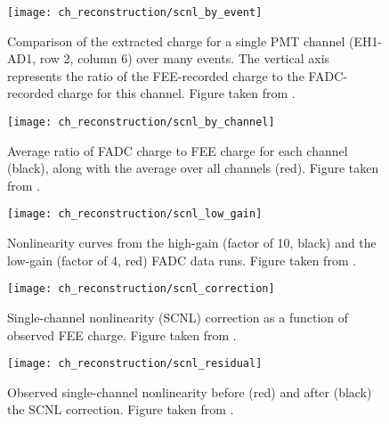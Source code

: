 \begin{figure}
    \centering
    \texttt{[image: ch\_reconstruction/scnl\_by\_event]}
    \caption[Flash ADC comparison to FEE, event by event]{
        Comparison of the extracted charge for a single PMT channel
        (EH1-AD1, row 2, column 6)
        over many events.
        The vertical axis represents the ratio of the FEE-recorded charge
        to the FADC-recorded charge for this channel.
        Figure taken from \cite{scnl_technote}.
    }
    \label{fig:scnl_by_event}
\end{figure}

\begin{figure}
    \centering
    \texttt{[image: ch\_reconstruction/scnl\_by\_channel]}
    \caption[Flash ADC comparison to FEE, channel by channel]{
        Average ratio of FADC charge to FEE charge for each channel (black),
        along with the average over all channels (red).
        Figure taken from \cite{scnl_technote}.
    }
    \label{fig:scnl_by_channel}
\end{figure}

\begin{figure}
    \centering
    \texttt{[image: ch\_reconstruction/scnl\_low\_gain]}
    \caption[Flash ADC comparison to FEE, low gain]{
        Nonlinearity curves from the high-gain (factor of 10, black)
        and the low-gain (factor of 4, red)
        FADC data runs.
        Figure taken from \cite{scnl_slides}.
    }
    \label{fig:scnl_low_gain}
\end{figure}

\begin{figure}
    \centering
    \texttt{[image: ch\_reconstruction/scnl\_correction]}
    \caption[SCNL: final correction curve]{
        Single-channel nonlinearity (SCNL) correction
        as a function of observed FEE charge.
        Figure taken from \cite{scnl_technote}.
    }
    \label{fig:scnl_correction}
\end{figure}

\begin{figure}
    \centering
    \texttt{[image: ch\_reconstruction/scnl\_residual]}
    \caption[SCNL: residual nonlinearity]{
        Observed single-channel nonlinearity before (red) and after (black)
        the SCNL correction.
        Figure taken from \cite{scnl_technote}.
    }
    \label{fig:scnl_residual}
\end{figure}

